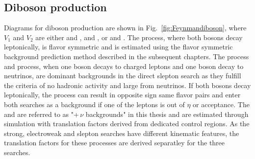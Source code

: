 \subsection*{Diboson production}
\noindent
\justify
Diagrams for diboson production are shown in Fig.~\ref{fig:Feynmandiboson}, where $V_1$ and $V_2$ are either \PW and \PW, \PZ and \PZ, or \PW and \PZ. 
The \PWW process, where both \PW bosons decay leptonically, is flavor symmetric and is estimated using the flavor symmetric background prediction method described in the subsequent chapters. 
The \PWW process and \PZZ process, when one \PZ boson decays to charged leptons and one \PZ boson decay to neutrinos, are dominant backgrounds in the direct slepton search as they fulfill the criteria of no hadronic activity and large \ptmiss from neutrinos. 
If both bosons decay leptonically, the \PWZ process can result in opposite sign same flavor pairs and enter both searches as a background if one of the leptons is out of $\eta$ or \pt acceptance. 
The \PZZ and \PWZ are referred to as "\PZ+$\,\nu$ backgrounds" in this thesis and are estimated through simulation with translation factors derived from dedicated control regions. 
As the strong, electroweak and slepton searches have different kinematic features, the translation factors for these processes are derived separatley for the three searches.
